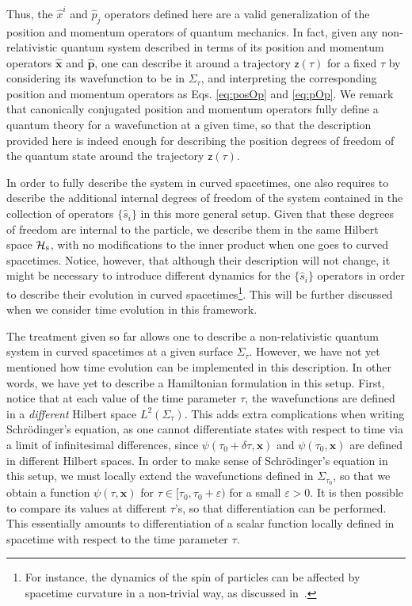 \documentclass[prd,twocolumn,superscriptaddress,floatfix,amsmath,amssymb,amsfonts,longbibliography,nofootinbib]{revtex4-1}
\newcommand{\mf}{\mathsf}%
\begin{document}
Thus, the $\hat{x}^i$ and $\hat{p}_j$ operators defined here are a valid generalization of the position and momentum operators of quantum mechanics. In fact, given any non-relativistic quantum system described in terms of its position and momentum operators $\hat{\bm x}$ and $\hat{\bm p}$, one can describe it around a trajectory $\mf z(\tau)$ for a fixed $\tau$ by considering its wavefunction to be in $\Sigma_\tau$, and interpreting the corresponding position and momentum operators as Eqs. \eqref{eq:posOp} and \eqref{eq:pOp}. We remark that canonically conjugated position and momentum operators fully define a quantum theory for a wavefunction at a given time, so that the description provided here is indeed enough for describing the position degrees of freedom of the quantum state around the trajectory $\mf z(\tau)$.

In order to fully describe the system in curved spacetimes, one also requires to describe the additional internal degrees of freedom of the system contained in the collection of operators $\{\hat{s}_i\}$ in this more general setup. Given that these degrees of freedom are internal to the particle, we describe them in the same Hilbert space $\mathcal{H}_\textsc{s}$, with no modifications to the inner product when one goes to curved spacetimes. Notice, however, that although their description will not change, it might be necessary to introduce different dynamics for the $\{\hat{s}_i\}$ operators in order to describe their evolution in curved spacetimes\footnote{For instance, the dynamics of the spin of particles can be affected by spacetime curvature in a non-trivial way, as discussed in~\cite{parker,jonas,theguy}.}. This will be further discussed when we consider time evolution in this framework. 

The treatment given so far allows one to describe a non-relativistic quantum system in curved spacetimes at a given surface $\Sigma_\tau$. However, we have not yet mentioned how time evolution can be implemented in this description. In other words, we have yet to describe a Hamiltonian formulation in this setup. First, notice that at each value of the time parameter $\tau$, the wavefunctions are defined in a \emph{different} Hilbert space $L^2(\Sigma_\tau)$. This adds extra complications when writing Schr\"odinger's equation, as one cannot differentiate states with respect to time via a limit of infinitesimal differences, since $\psi(\tau_0+\delta\tau,\bm x)$ and $\psi(\tau_0,\bm x)$ are defined in different Hilbert spaces. In order to make sense of Schr\"odinger's equation in this setup, we must locally extend the wavefunctions defined in $\Sigma_{\tau_0}$, so that we obtain a function $\psi(\tau,\bm x)$ for $\tau\in[\tau_0,\tau_0 + \varepsilon)$ for a small $\varepsilon>0$. It is then possible to compare its values at different $\tau$'s, so that differentiation can be performed. This essentially amounts to differentiation of a scalar function locally defined in spacetime with respect to the time parameter $\tau$.
\end{document}
